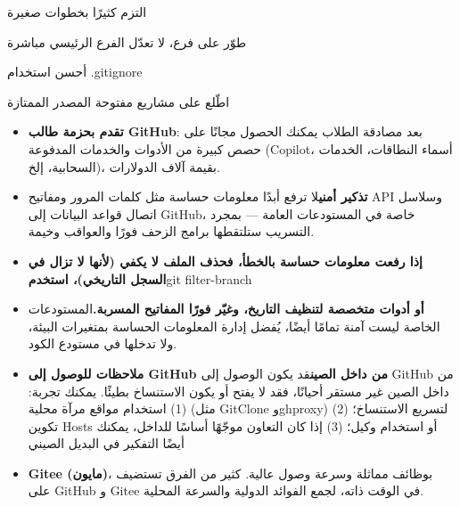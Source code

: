 التزم كثيرًا بخطوات صغيرة


طوّر على فرع، لا تعدّل الفرع الرئيسي مباشرة


أحسن استخدام .gitignore


اطّلع على مشاريع مفتوحة المصدر الممتازة


\begin{itemize}
  \item \textbf{تقدم بحزمة طالب GitHub}: بعد مصادقة الطلاب يمكنك الحصول مجانًا على حصص كبيرة من الأدوات والخدمات المدفوعة (Copilot، أسماء النطاقات، الخدمات السحابية، إلخ)، بقيمة آلاف الدولارات.
  \item \textbf{تذكير أمني}لا ترفع أبدًا معلومات حساسة مثل كلمات المرور ومفاتيح API وسلاسل اتصال قواعد البيانات إلى GitHub، خاصة في المستودعات العامة — بمجرد التسريب ستلتقطها برامج الزحف فورًا والعواقب وخيمة.
  \item \textbf{إذا رفعت معلومات حساسة بالخطأ، فحذف الملف لا يكفي (لأنها لا تزال في السجل التاريخي)، استخدم}git filter-branch
  \item \textbf{أو أدوات متخصصة لتنظيف التاريخ، وغيّر فورًا المفاتيح المسربة.}المستودعات الخاصة ليست آمنة تمامًا أيضًا، يُفضل إدارة المعلومات الحساسة بمتغيرات البيئة، ولا تدخلها في مستودع الكود.
  \item \textbf{ملاحظات للوصول إلى GitHub من داخل الصين}قد يكون الوصول إلى GitHub من داخل الصين غير مستقر أحيانًا، فقد لا يفتح أو يكون الاستنساخ بطيئًا. يمكنك تجربة: (1) استخدام مواقع مرآة محلية (مثل GitClone وghproxy) لتسريع الاستنساخ؛ (2) تكوين Hosts أو استخدام وكيل؛ (3) إذا كان التعاون موجّهًا أساسًا للداخل، يمكنك أيضًا التفكير في البديل الصيني
  \item \textbf{Gitee (مايون)}، بوظائف مماثلة وسرعة وصول عالية. كثير من الفرق تستضيف على GitHub و Gitee في الوقت ذاته، لجمع الفوائد الدولية والسرعة المحلية.
\end{itemize}

